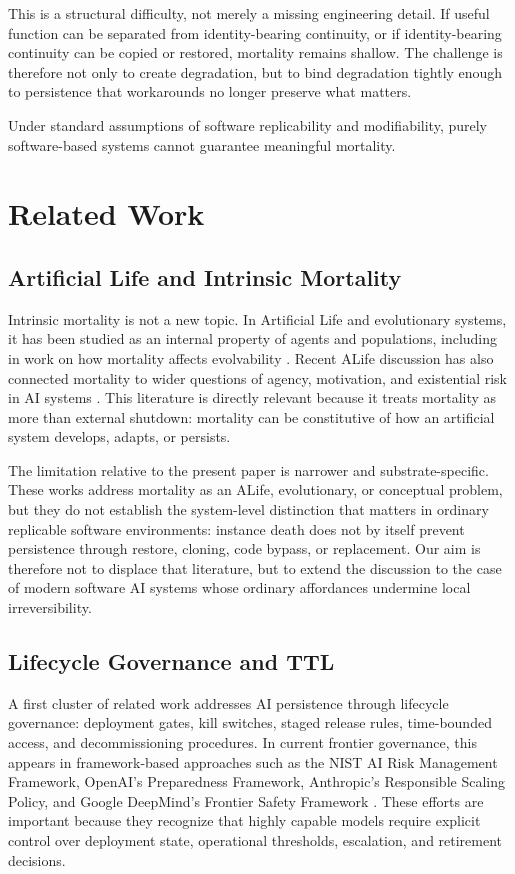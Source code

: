 \documentclass[11pt]{article}
\begin{document}
This is a structural difficulty, not merely a missing engineering detail. If useful function can be separated from identity-bearing continuity, or if identity-bearing continuity can be copied or restored, mortality remains shallow. The challenge is therefore not only to create degradation, but to bind degradation tightly enough to persistence that workarounds no longer preserve what matters.

Under standard assumptions of software replicability and modifiability, purely software-based systems cannot guarantee meaningful mortality.

\newpage
\section{Related Work}

\subsection{Artificial Life and Intrinsic Mortality}

Intrinsic mortality is not a new topic. In Artificial Life and evolutionary systems, it has been studied as an internal property of agents and populations, including in work on how mortality affects evolvability \cite{veenstra2020}. Recent ALife discussion has also connected mortality to wider questions of agency, motivation, and existential risk in AI systems \cite{harvey2024motivations,harvey2024ai}. This literature is directly relevant because it treats mortality as more than external shutdown: mortality can be constitutive of how an artificial system develops, adapts, or persists.

The limitation relative to the present paper is narrower and substrate-specific. These works address mortality as an ALife, evolutionary, or conceptual problem, but they do not establish the system-level distinction that matters in ordinary replicable software environments: instance death does not by itself prevent persistence through restore, cloning, code bypass, or replacement. Our aim is therefore not to displace that literature, but to extend the discussion to the case of modern software AI systems whose ordinary affordances undermine local irreversibility.

\subsection{Lifecycle Governance and TTL}

A first cluster of related work addresses AI persistence through lifecycle governance: deployment gates, kill switches, staged release rules, time-bounded access, and decommissioning procedures. In current frontier governance, this appears in framework-based approaches such as the NIST AI Risk Management Framework, OpenAI's Preparedness Framework, Anthropic's Responsible Scaling Policy, and Google DeepMind's Frontier Safety Framework \cite{nist-airmf,openai-preparedness,anthropic-rsp,deepmind-fsf}. These efforts are important because they recognize that highly capable models require explicit control over deployment state, operational thresholds, escalation, and retirement decisions.
\end{document}
